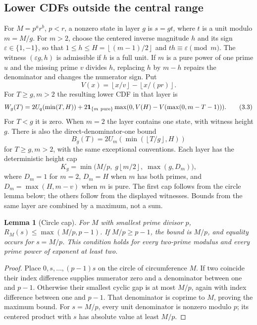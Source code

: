\documentclass[11pt]{article}
\newtheorem{lemma}[theorem]{Lemma}
\theoremstyle{definition}\newtheorem{definition}[theorem]{Definition}
\theoremstyle{remark}\newtheorem{remark}[theorem]{Remark}
\newcommand{\unit}{\mathbf1}
\newcommand{\floor}[1]{\left\lfloor #1\right\rfloor}
\begin{document}
\subsection{Lower CDFs outside the central range}
For \(M=p^a r^b\), \(p<r\), a nonzero state in layer \(g\) is \(s=gt\),
where \(t\) is a unit modulo \(m=M/g\).
For \(m>2\), choose the centered inverse magnitude \(h\) and its sign
\(\varepsilon\in\{1,-1\}\), so that
\(1\le h\le H=\floor{(m-1)/2}\) and \(th\equiv\varepsilon\pmod m\).
The witness \((\varepsilon g,h)\) is admissible if \(h\) is a full unit.
If \(m\) is a pure power of one prime \(u\) and the missing prime \(v\)
divides \(h\), replacing \(h\) by \(m-h\) repairs the denominator and
changes the numerator sign. Put
\[
 V(x)=\floor{x/v}-\floor{x/(pr)}.
\]
For \(T\ge g,m>2\) the resulting lower CDF in that layer is
\[
 W_g(T)=2U_q(\min(T,H))
 +2\unit_{\{m\ {\rm pure}\}}
  \max(0,V(H)-V(\max(0,m-T-1))).                    \tag{3.3}
\]
For \(T<g\) it is zero. When \(m=2\) the layer contains one state,
with witness height \(g\). There is also the direct-denominator-one bound
\[
 B_g(T)=2U_m(\min(\floor{T/g},H))                 \tag{3.4}
\]
for \(T\ge g,m>2\), with the same exceptional conventions.
Each layer has the deterministic height cap
\[
 K_g=\min\bigl(M/p,\;g\floor{m/2},\;\max(g,D_m)\bigr), \tag{3.5}
\]
where \(D_m=1\) for \(m=2\), \(D_m=H\) when \(m\) has both primes, and
\(D_m=\max(H,m-v)\) when \(m\) is pure.
The first cap follows from the circle lemma below; the others follow
from the displayed witnesses. Bounds from the same layer are combined
by a maximum, not a sum.

\begin{lemma}[Circle cap]\label{lem:circle}
For \(M\) with smallest prime divisor \(p\),
\(R_M(s)\le\max(M/p,p-1)\).
If \(M/p\ge p-1\), the bound is \(M/p\), and equality occurs for
\(s=M/p\). This condition holds for every two-prime modulus and
every prime power of exponent at least two.
\end{lemma}
\begin{proof}
Place \(0,s,\ldots,(p-1)s\) on the circle of circumference \(M\).
If two coincide their index difference supplies numerator zero and a
denominator between one and \(p-1\). Otherwise their smallest cyclic
gap is at most \(M/p\), again with index difference between one and
\(p-1\). That denominator is coprime to \(M\), proving the maximum bound.
For \(s=M/p\), every unit denominator is nonzero modulo \(p\);
its centered product with \(s\) has absolute value at least \(M/p\).
\end{proof}
\end{document}
